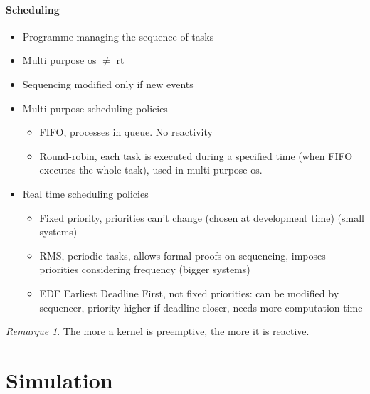 \documentclass[10pt]{article}
\theoremstyle{plain}
\theoremstyle{definition}
\theoremstyle{remark}
\newtheorem{rem}{Remarque}
\begin{document}
\paragraph{Scheduling}
\begin{itemize}
    \item Programme managing the sequence of tasks
    \item Multi purpose os $\ne$ rt
    \item Sequencing modified only if new events
    \item Multi purpose scheduling policies
        \begin{itemize}
            \item FIFO, processes in queue. No reactivity
            \item Round-robin, each task is executed during a specified time
                (when FIFO executes the whole task), used in multi purpose os.
        \end{itemize}
    \item Real time scheduling policies
        \begin{itemize}
            \item Fixed priority, priorities can't change (chosen at development
                time) (small systems)
            \item RMS, periodic tasks, allows formal proofs on
                sequencing, imposes priorities considering frequency (bigger
                systems)
            \item EDF Earliest Deadline First, not fixed priorities: can be
                modified by sequencer, priority higher if deadline closer, needs
                more computation time
        \end{itemize}
\end{itemize}
\begin{rem}
    The more a kernel is preemptive, the more it is reactive.
\end{rem}

\section{Simulation}
\end{document}
